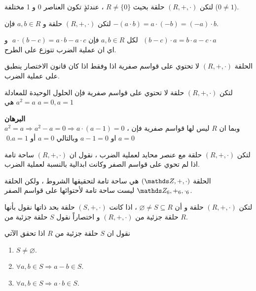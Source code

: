  \begin{theorem}
 	لتكن $(R, +, \cdot)$ حلقة بحيث $R\neq \{0\}$ ، عندئذٍ تكون العناصر 0 و 1 مختلفة ($0\neq 1$).
 \end{theorem}
 
 \begin{theorem}
 	لتكن $(R, +, \cdot)$ حلقة و $a,b\in R$ فإن 
 	$-(a\cdot b) = a\cdot (-b) = (-a)\cdot b$.
 \end{theorem}
 
 \begin{corollary}
 	لكل $a,b\in R$ فإن
 	$a\cdot (b-c) = a\cdot b - a\cdot c$\,\,  و \,\,$(b-c) \cdot a = b\cdot a - c\cdot a$\\
 	اي ان عملية الضرب تتوزع على الطرح.
 \end{corollary}
 
 \begin{theorem}
 	الحلقة $(R, +, \cdot)$ لا تحتوي على قواسم صفرية اذا وفقط اذا كان قانون الاختصار ينطبق على عملية الضرب.
 \end{theorem}
 
 \begin{corollary}
 	لتكن $(R, +, \cdot)$ حلقة لا تحتوي على قواسم صفرية فإن الحلول الوحيدة للمعادلة $a^2=a$ هي  $a=0, a=1$ 
 \end{corollary}
 \noindent
 \textbf{البرهان}\\
 \noindent
 $a^2 =a\Rightarrow a^2-a=0\Rightarrow a\cdot(a-1)=0 $ ، وبما ان $R$ ليس لها قواسم صفرية فإن $a=0$ او $a-1=0$ وبالتالي $a=0 $ أو $a=1$.\qed
 
 \begin{definition}[]
 	لتكن $(R, +, \cdot)$ حلقة مع عنصر محايد لعملية الضرب ، نقول ان $(R, +, \cdot)$ ساحة تامة اذا لم تحوي على قواسم الصفر وكانت ابدالية بالنسبة لعملية الضرب.
 \end{definition}
 
 \begin{example}
 	الحلقة $(\Z, +, \cdot)$ هي ساحة تامة لتحقيقها الشروط ، ولكن الحلقة 
 	$\Z_6, +_6, \cdot_6$ ليست ساحة تامة لأحتوائها على قواسم الصفر.
 \end{example}
 
 
 \begin{definition}
 	لتكن $(R, +, \cdot)$ حلقة و أن $\varnothing\neq S\subseteq R$ ، اذا كانت $(S, +, \cdot)$ حلقة بحد ذاتها نقول بأنها حلقة جزئية من $(R, +, \cdot)$ و اختصاراً نقول $S$ حلقة جزئية من $R$.
 \end{definition}
 
 \begin{note}
 	نقول ان $S$ حلقة جزئية من $R$ اذا تحقق الآتي
 	\begin{enumerate}[label=$\boxed{\arabic*}$]
 		\item $S\neq \varnothing$.
 		\item $\forall a,b\in S \Rightarrow a-b\in S$.
 		\item $\forall a,b\in S\Rightarrow a\cdot b\in S$.
 	\end{enumerate}
 \end{note}
 

